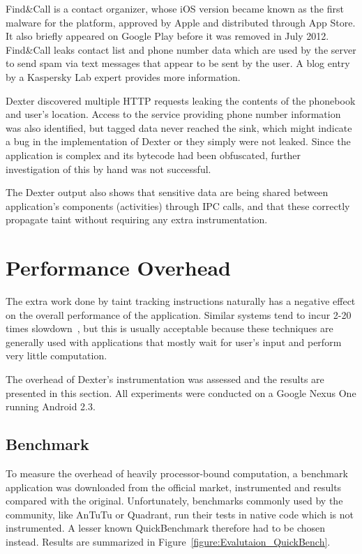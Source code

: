 \documentclass[12pt,twoside,notitlepage]{report}
\begin{document}
Find\&Call is a contact organizer, whose iOS version became known as the first malware for the platform, approved by Apple and distributed through App Store. It also briefly appeared on Google Play before it was removed in July 2012. Find\&Call leaks contact list and phone number data which are used by the server to send spam via text messages that appear to be sent by the user. A blog entry~\cite{report:FindAndCall} by a Kaspersky Lab expert provides more information.

Dexter discovered multiple HTTP requests leaking the contents of the phonebook and user's location. Access to the service providing phone number information was also identified, but tagged data never reached the sink, which might indicate a bug in the implementation of Dexter or they simply were not leaked. Since the application is complex and its bytecode had been obfuscated, further investigation of this by hand was not successful. 

The Dexter output also shows that sensitive data are being shared between application's components (activities) through IPC calls, and that these correctly propagate taint without requiring any extra instrumentation.

\section{Performance Overhead}

The extra work done by taint tracking instructions naturally has a negative effect on the overall performance of the application. Similar systems tend to incur 2-20 times slowdown~\cite{Yin:2007:PCS:1315245.1315261, Chow:2004:UDL:1251375.1251397}, but this is usually acceptable because these techniques are generally used with applications that mostly wait for user's input and perform very little computation. 

The overhead of Dexter's instrumentation was assessed and the results are presented in this section. All experiments were conducted on a Google Nexus One running Android 2.3. 

\subsection{Benchmark}

To measure the overhead of heavily processor-bound computation, a benchmark application was downloaded from the official market, instrumented and results compared with the original. Unfortunately, benchmarks commonly used by the community, like AnTuTu or Quadrant, run their tests in native code which is not instrumented. A lesser known QuickBenchmark therefore had to be chosen instead. Results are summarized in Figure~\ref{figure:Evalutaion_QuickBench}. 
\end{document}
